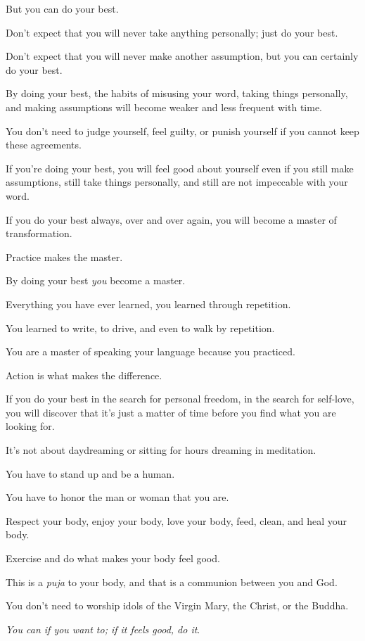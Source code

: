 \documentclass{article}
\numberwithin{equation}{section}
\begin{document}
But you can do your best.

Don't expect that you will never take anything personally; just do your best.

Don't expect that you will never make another assumption, but you can certainly do your best.

%
By doing your best, the habits of misusing your word, taking things personally, and making assumptions will become weaker and less frequent with time.

You don't need to judge yourself, feel guilty, or punish yourself if you cannot keep these agreements.

If you're doing your best, you will feel good about yourself even if you still make assumptions, still take things personally, and still are not impeccable with your word.

%
If you do your best always, over and over again, you will become a master of transformation.

Practice makes the master.

By doing your best \textit{you} become a master.

Everything you have ever learned, you learned through repetition.

You learned to write, to drive, and even to walk by repetition.

You are a master of speaking your language because you practiced.

Action is what makes the difference.

%
If you do your best in the search for personal freedom, in the search for self-love, you will discover that it's just a matter of time before you find what you are looking for.

It's not about daydreaming or sitting for hours dreaming in meditation.

You have to stand up and be a human.

You have to honor the man or woman that you are.

Respect your body, enjoy your body, love your body, feed, clean, and heal your body.

Exercise and do what makes your body feel good.

This is a \textit{puja} to your body, and that is a communion between you and God.

%
You don't need to worship idols of the Virgin Mary, the Christ, or the Buddha.

\textit{You can if you want to; if it feels good, do it}.
\end{document}
